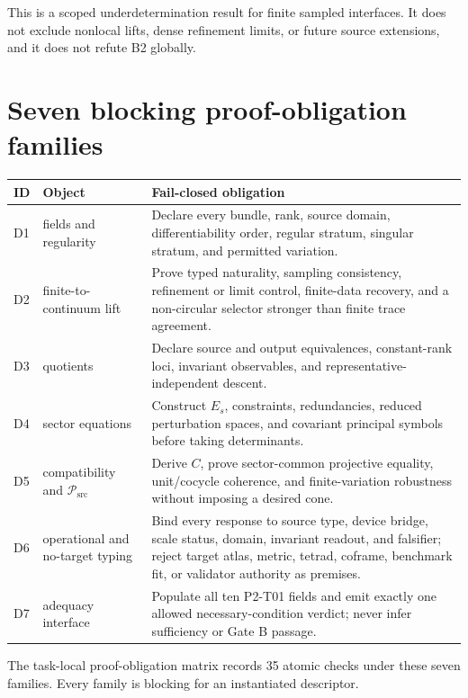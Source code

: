 \documentclass[11pt]{article}
\theoremstyle{definition}
\theoremstyle{plain}
\newcommand{\Psrc}{\mathcal{P}_{\mathrm{src}}}
\begin{document}
This is a scoped underdetermination result for finite sampled interfaces. It
does not exclude nonlocal lifts, dense refinement limits, or future source
extensions, and it does not refute B2 globally.

\section{Seven blocking proof-obligation families}

\begin{longtable}{>{\raggedright\arraybackslash}p{}>{\raggedright\arraybackslash}p{}>{\raggedright\arraybackslash}p{}}
\toprule
ID & Object & Fail-closed obligation\\
\midrule
D1 & fields and regularity & Declare every bundle, rank, source domain, differentiability order, regular stratum, singular stratum, and permitted variation.\\
D2 & finite-to-continuum lift & Prove typed naturality, sampling consistency, refinement or limit control, finite-data recovery, and a non-circular selector stronger than finite trace agreement.\\
D3 & quotients & Declare source and output equivalences, constant-rank loci, invariant observables, and representative-independent descent.\\
D4 & sector equations & Construct $E_s$, constraints, redundancies, reduced perturbation spaces, and covariant principal symbols before taking determinants.\\
D5 & compatibility and $\Psrc$ & Derive $C$, prove sector-common projective equality, unit/cocycle coherence, and finite-variation robustness without imposing a desired cone.\\
D6 & operational and no-target typing & Bind every response to source type, device bridge, scale status, domain, invariant readout, and falsifier; reject target atlas, metric, tetrad, coframe, benchmark fit, or validator authority as premises.\\
D7 & adequacy interface & Populate all ten P2-T01 fields and emit exactly one allowed necessary-condition verdict; never infer sufficiency or Gate B passage.\\
\bottomrule
\end{longtable}

The task-local proof-obligation matrix records 35 atomic checks under these
seven families. Every family is blocking for an instantiated descriptor.
\end{document}
